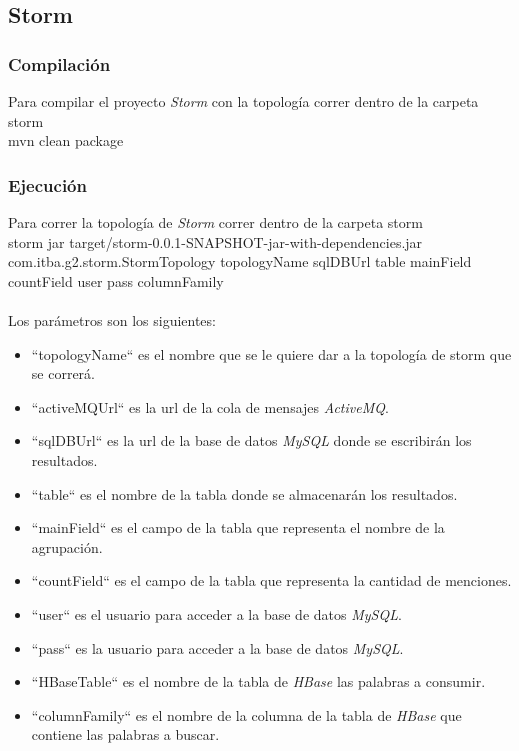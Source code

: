 \documentclass[a4paper,10pt]{article}
\begin{document}
\subsection{Storm}

\subsubsection{Compilación}

Para compilar el proyecto \textit{Storm} con la topología correr dentro de la carpeta storm
\\

	mvn clean package

\subsubsection{Ejecución}

Para correr la topología de \textit{Storm} correr dentro de la carpeta storm
\\

	storm jar target/storm-0.0.1-SNAPSHOT-jar-with-dependencies.jar com.itba.g2.storm.StormTopology topologyName sqlDBUrl table mainField countField user pass columnFamily
\\
\\
Los parámetros son los siguientes:

\begin{itemize}
	\item ``topologyName`` es el nombre que se le quiere dar a la topología de storm que se correrá.
    \item  ``activeMQUrl`` es la url de la cola de mensajes \textit{ActiveMQ}.
	\item ``sqlDBUrl`` es la url de la base de datos \textit{MySQL} donde se escribirán los resultados.
	\item ``table`` es el nombre de la tabla donde se almacenarán los resultados.
	\item ``mainField`` es el campo de la tabla que representa el nombre de la agrupación.
	\item ``countField`` es el campo de la tabla que representa la cantidad de menciones.
	\item ``user`` es el usuario para acceder a la base de datos \textit{MySQL}.
	\item ``pass`` es la usuario para acceder a la base de datos \textit{MySQL}.
    \item ``HBaseTable`` es el nombre de la tabla de \textit{HBase} las palabras a consumir.
	\item ``columnFamily`` es el nombre de la columna de la tabla de \textit{HBase} que contiene las palabras a buscar.
\end{itemize}
\end{document}
